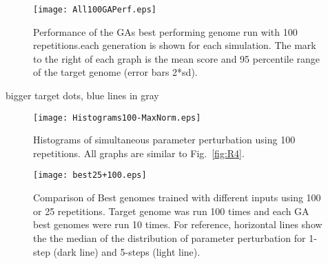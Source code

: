 \clearpage


\begin{figure}[tb!]
  \centering
  \texttt{[image: All100GAPerf.eps]}
  \caption{Performance of the GAs best performing genome run with 100 repetitions.each
    generation is shown for each simulation. The mark to the right of
    each graph is the mean score and 95 percentile range of the target
    genome (error bars 2*sd).}\label{fig:R5}
\end{figure}
bigger target dots, blue lines in gray




\begin{figure}[tb!]
  \centering
  \texttt{[image: Histograms100-MaxNorm.eps]}  
  \caption{Histograms of simultaneous parameter perturbation using 100 repetitions. All graphs are similar to
    Fig.~\ref{fig:R4}. %
  }\label{fig:R6}
\end{figure}
\clearpage




\begin{figure}[tb!]
  \centering
  \texttt{[image: best25+100.eps]}
  \caption{Comparison of Best genomes trained with different inputs using 100 or
    25 repetitions.  Target genome was run 100 times and each GA best genomes
    were run 10 times. For reference, horizontal lines show the the median of
    the distribution of parameter perturbation for 1-step (dark line) and
    5-steps (light line).}\label{fig:R7}
\end{figure}
